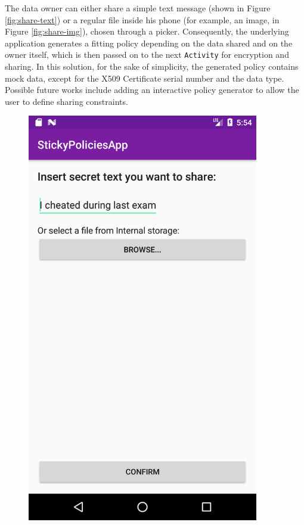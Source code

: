 The data owner can either share a simple text message (shown in Figure \ref{fig:share-text}) or a regular file inside his phone (for example, an image, in Figure \ref{fig:share-img}), chosen through a picker. Consequently, the underlying application generates a fitting policy depending on the data shared and on the owner itself, which is then passed on to the next \texttt{Activity} for encryption and sharing. In this solution, for the sake of simplicity, the generated policy contains mock data, except for the X509 Certificate serial number and the data type. Possible future works include adding an interactive policy generator to allow the user to define sharing constraints.
\begin{figure}
	\centering
	\begin{minipage}{0.35\textwidth}
		\centering
		\includegraphics[width=0.9\textwidth]{ShareData-text.png} %

\end{minipage}
\end{figure}
